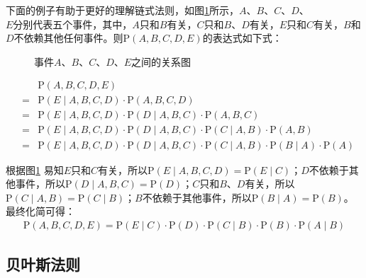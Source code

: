 \parinterval 下面的例子有助于更好的理解链式法则，如图\ref{fig:2-5}所示，$A$、$B$、$C$、$D$、\\ $E$分别代表五个事件，其中，$A$只和$B$有关，$C$只和$B$、$D$有关，$E$只和$C$有关，$B$和$D$不依赖其他任何事件。则$\textrm{P}(A,B,C,D,E)$的表达式如下式：

\begin{figure}[htp]
\centering

\setlength{\belowcaptionskip}{-1cm}
\caption{事件$A$、$B$、$C$、$D$、$E$之间的关系图}
\label{fig:2-5}
\end{figure}

\begin{eqnarray}
&   & \textrm{P}(A,B,C,D,E) \nonumber \\
&=&\textrm{P}(E \mid A,B,C,D) \cdot \textrm{P}(A,B,C,D) \nonumber \\
&=&\textrm{P}(E \mid A,B,C,D) \cdot \textrm{P}(D \mid A,B,C) \cdot \textrm{P}(A,B,C) \nonumber \\
&=&\textrm{P}(E \mid A,B,C,D) \cdot \textrm{P}(D \mid A,B,C) \cdot \textrm{P}(C \mid A,B) \cdot \textrm{P}(A,B) \nonumber \\
&=&\textrm{P}(E \mid A,B,C,D) \cdot \textrm{P}(D \mid A,B,C) \cdot \textrm{P}(C \mid A,B) \cdot \textrm{P}(B \mid A) \cdot \textrm{P}(A)
\label{eq:2-7}
\end{eqnarray}

\parinterval 根据图\ref {fig:2-5} 易知$E$只和$C$有关，所以$\textrm{P}(E \mid A,B,C,D)=\textrm{P}(E \mid C)$；$D$不依赖于其他事件，所以$\textrm{P}(D \mid A,B,C)=\textrm{P}(D)$；$C$只和$B$、$D$有关，所以$\textrm{P}(C \mid A,B)=\textrm{P}(C \mid B)$；$B$不依赖于其他事件，所以$\textrm{P}(B \mid  A)=\textrm{P}(B)$。最终化简可得：
\begin{eqnarray}
\textrm{P}(A,B,C,D,E)=\textrm{P}(E \mid C) \cdot \textrm{P}(D) \cdot \textrm{P}(C \mid B) \cdot \textrm{P}(B)\cdot \textrm{P}(A \mid B)
\label{eq:2-8}
\end{eqnarray}


\subsection{贝叶斯法则}\label{sec:2.2.3}

